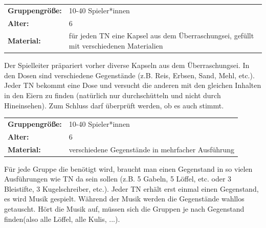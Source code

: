 \begin{table}[h]
\begin{tabular}{>{\bfseries}lp{8cm}}
   Gruppengröße:   & 10-40 Spieler*innen\\
    Alter: & 6 \\
    Material: &  
        für jeden TN eine Kapsel aus dem Überraschungsei, gefüllt mit verschiedenen Materialien
    \\
\end{tabular}
\end{table} 
   
        Der Spielleiter präpariert vorher diverse Kapseln aus dem Überraschungsei. In den Dosen sind verschiedene Gegenstände (z.B. Reis, Erbsen, Sand, Mehl, etc.).  Jeder TN bekommt eine Dose und versucht die anderen mit den gleichen Inhalten in den Eiern zu finden (natürlich nur durchschütteln und nicht durch Hineinsehen). Zum Schluss darf überprüft werden, ob es auch stimmt.\\
    




\begin{table}[h]
\begin{tabular}{>{\bfseries}lp{8cm}}
   Gruppengröße:   & 10-40 Spieler*innen\\
    Alter: &  6\\
    Material: &  
        verschiedene Gegenstände in mehrfacher Ausführung\\
\end{tabular}
\end{table} 
Für jede Gruppe die benötigt wird, braucht man einen Gegenstand in so vielen Ausführungen wie TN da sein sollen (z.B. 5 Gabeln, 5 Löffel, etc. oder 3 Bleistifte, 3 Kugelschreiber, etc.). Jeder TN erhält erst einmal einen Gegenstand, es wird Musik gespielt. Während der Musik werden die Gegenstände wahllos getauscht. Hört die Musik auf, müssen sich die Gruppen je nach Gegenstand finden(also alle Löffel, alle Kulis, ...).
    \\

\newpage


